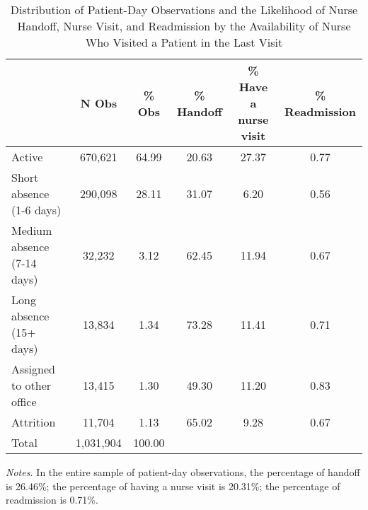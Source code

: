 \documentclass[final,12pt, notitlepage]{article}
\begin{document}
\begin{singlespace}
\clearpage
\begin{table}[H]
\centering
\footnotesize
\caption{Distribution of Patient-Day Observations and the Likelihood of Nurse Handoff, Nurse Visit, and Readmission by the Availability of Nurse Who Visited a Patient in the Last Visit}
\label{tab:lws_dist}
\begin{threeparttable}
\begin{tabular}{lccccc}
\toprule
& N Obs                    & \% Obs & \% Handoff & \% Have a nurse visit & \% Readmission   \\
\midrule
Active                   & 670,621 & 64.99      & 20.63            & 27.37          & 0.77 \\
Short absence (1-6 days) & 290,098 & 28.11      & 31.07            & 6.20           & 0.56 \\
Medium absence (7-14 days)     & 32,232  & 3.12       & 62.45            & 11.94          & 0.67 \\
Long absence (15+ days)  & 13,834  & 1.34       & 73.28            & 11.41          & 0.71  \\
Assigned to other office     & 13,415  & 1.30       & 49.30            & 11.20          & 0.83 \\
Attrition                & 11,704  & 1.13       & 65.02            & 9.28           & 0.67 \\
\midrule
Total                    & 1,031,904 & 100.00     &                &                  &     \\
\bottomrule
\end{tabular}
	\begin{tablenotes}
	\item \emph{Notes.} In the entire sample of patient-day observations, the percentage of handoff is 26.46\%; the percentage of having a nurse visit is 20.31\%; the percentage of readmission is 0.71\%.
	\end{tablenotes}
\end{threeparttable}
\end{table}




\end{singlespace}
\end{document}
